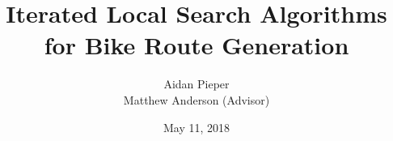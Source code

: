 \documentclass{beamer}
\title[Bike Route Algorithms]{Iterated Local Search Algorithms for Bike Route Generation}
\author{Aidan Pieper\\\footnotesize{Matthew Anderson (Advisor)}}
\institute{Computer Science Department, Union College}
\date{May 11, 2018}
\begin{document}
\begin{frame}
  \titlepage
\end{frame}


%
%
%
%
%
%
%
%
%
%
%
\end{document}
